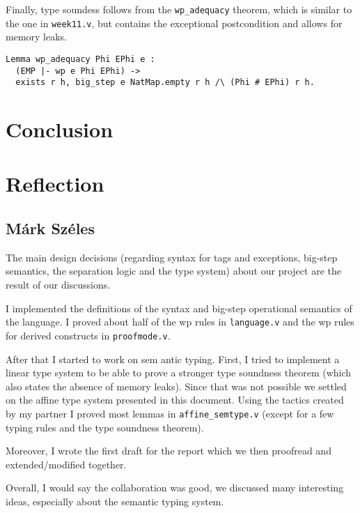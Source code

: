 \documentclass{article}
\begin{document}
Finally, type soundess follows from the \texttt{wp\_adequacy} theorem, which is similar to the one in \texttt{week11.v},
but contains the exceptional postcondition and allows for memory leaks.
\begin{lstlisting}
Lemma wp_adequacy Phi EPhi e :
  (EMP |- wp e Phi EPhi) ->
  exists r h, big_step e NatMap.empty r h /\ (Phi # EPhi) r h.
\end{lstlisting}

\section{Conclusion}

\section{Reflection}

\subsection{Márk Széles}

The main design decisions (regarding syntax for tags and exceptions, big-step semantics, the separation logic and the type system) about our project are the result of our discussions.

I implemented the definitions of the syntax and big-step operational semantics of the language. I proved about half of the wp rules in \texttt{language.v} and the wp rules for derived constructs in \texttt{proofmode.v}.

After that I started to work on sem	antic typing. First, I tried to implement a linear type system to be able to prove a stronger type soundness theorem (which also states the absence of memory leaks). Since that was not possible we settled on the affine type system presented in this document. Using the tactics created by my partner I proved most lemmas in \texttt{affine\_semtype.v} (except for a few typing rules and the type soundness theorem). 

Moreover, I wrote the first draft for the report which we then proofread and extended/modified together.

Overall, I would say the collaboration was good, we discussed many interesting ideas, especially about the semantic typing system.
\end{document}
